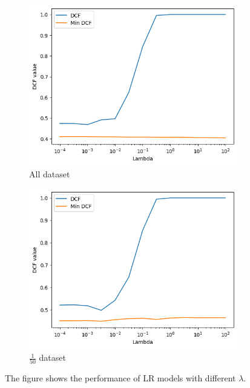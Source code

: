 \documentclass{article}
\begin{document}
\begin{figure}[ht]
    \centering
    \begin{subfigure}[b]{0.45\textwidth}
        \centering
        \includegraphics[width=\textwidth]{images/lr_lambda.png}
        \caption{All dataset}
        \label{fig:lr_lambda}
    \end{subfigure}
    \hfill
    \begin{subfigure}[b]{0.45\textwidth}
        \centering
        \includegraphics[width=\textwidth]{images/lr_lambda_50.png}
        \caption{$\frac{1}{50}$ dataset}
        \label{fig:lr_lambda_50}
    \end{subfigure}
    \caption{The figure shows the performance of LR models with different $\lambda$.}
\end{figure}
\end{document}
